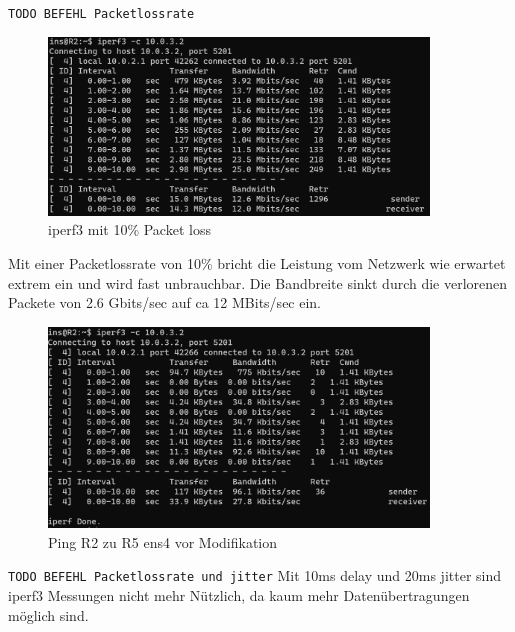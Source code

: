 \documentclass[11pt,titlepage]{article}
\begin{document}
\lstinline!TODO BEFEHL Packetlossrate!

\begin{figure}[H]
  \begin{center}
  	\includegraphics[width=0.90\textwidth]{"images/iperf3 R2 10 packet loss"}
  	\caption{iperf3 mit 10\% Packet loss}
  	\label{fig:iperf3-R2-10-packet-loss}
  \end{center}
\end{figure}

Mit einer Packetlossrate von 10\% bricht die Leistung vom Netzwerk wie erwartet extrem ein und wird fast unbrauchbar. Die Bandbreite sinkt durch die verlorenen Packete von 2.6 Gbits/sec auf ca 12 MBits/sec ein.

\begin{figure}[H]
  \begin{center}
  	\includegraphics[width=0.90\textwidth]{"images/iperf3 R2 10ms delay 20ms jitter"}
  	\caption{Ping R2 zu R5 ens4 vor Modifikation}
  	\label{fig:iperf3-R2-10ms-delay-20ms-jitter}
  \end{center}
\end{figure}

\lstinline!TODO BEFEHL Packetlossrate und jitter!
Mit 10ms delay und 20ms jitter sind iperf3 Messungen nicht mehr Nützlich, da kaum mehr Datenübertragungen möglich sind.
\end{document}
